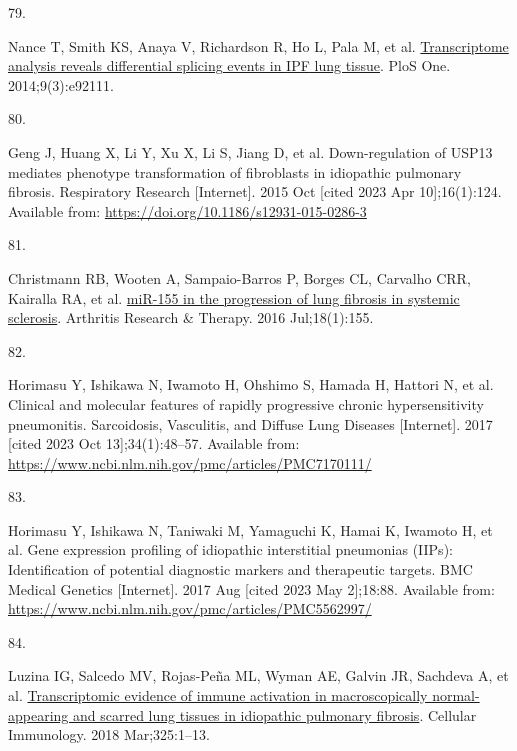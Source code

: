 \documentclass[
]{article}
\newlength{\cslhangindent}
\newlength{\csllabelwidth}
\newenvironment{CSLReferences}[2] %
 {\begin{list}{}{%
  \setlength{\itemindent}{0pt}
  \setlength{\leftmargin}{0pt}
  \setlength{\parsep}{0pt}
  \ifodd #1
   \setlength{\leftmargin}{\cslhangindent}
   \setlength{\itemindent}{-1\cslhangindent}
  \fi
  \setlength{\itemsep}{#2\baselineskip}}}
 {\end{list}}
\newcommand{\CSLLeftMargin}[1]{\parbox[t]{\csllabelwidth}{\strut#1\strut}}
\newcommand{\CSLRightInline}[1]{\parbox[t]{\linewidth - \csllabelwidth}{\strut#1\strut}}
\begin{document}
\begin{CSLReferences}{0}{1}
\CSLLeftMargin{79. }%
\CSLRightInline{Nance T, Smith KS, Anaya V, Richardson R, Ho L, Pala M, et al. \href{https://doi.org/10.1371/journal.pone.0092111}{Transcriptome analysis reveals differential splicing events in {IPF} lung tissue}. PloS One. 2014;9(3):e92111. }

\CSLLeftMargin{80. }%
\CSLRightInline{Geng J, Huang X, Li Y, Xu X, Li S, Jiang D, et al. Down-regulation of {USP13} mediates phenotype transformation of fibroblasts in idiopathic pulmonary fibrosis. Respiratory Research {[}Internet{]}. 2015 Oct {[}cited 2023 Apr 10{]};16(1):124. Available from: \url{https://doi.org/10.1186/s12931-015-0286-3}}

\CSLLeftMargin{81. }%
\CSLRightInline{Christmann RB, Wooten A, Sampaio-Barros P, Borges CL, Carvalho CRR, Kairalla RA, et al. \href{https://doi.org/10.1186/s13075-016-1054-6}{{miR}-155 in the progression of lung fibrosis in systemic sclerosis}. Arthritis Research \& Therapy. 2016 Jul;18(1):155. }

\CSLLeftMargin{82. }%
\CSLRightInline{Horimasu Y, Ishikawa N, Iwamoto H, Ohshimo S, Hamada H, Hattori N, et al. Clinical and molecular features of rapidly progressive chronic hypersensitivity pneumonitis. Sarcoidosis, Vasculitis, and Diffuse Lung Diseases {[}Internet{]}. 2017 {[}cited 2023 Oct 13{]};34(1):48--57. Available from: \url{https://www.ncbi.nlm.nih.gov/pmc/articles/PMC7170111/}}

\CSLLeftMargin{83. }%
\CSLRightInline{Horimasu Y, Ishikawa N, Taniwaki M, Yamaguchi K, Hamai K, Iwamoto H, et al. Gene expression profiling of idiopathic interstitial pneumonias ({IIPs}): Identification of potential diagnostic markers and therapeutic targets. BMC Medical Genetics {[}Internet{]}. 2017 Aug {[}cited 2023 May 2{]};18:88. Available from: \url{https://www.ncbi.nlm.nih.gov/pmc/articles/PMC5562997/}}

\CSLLeftMargin{84. }%
\CSLRightInline{Luzina IG, Salcedo MV, Rojas-Peña ML, Wyman AE, Galvin JR, Sachdeva A, et al. \href{https://doi.org/10.1016/j.cellimm.2018.01.002}{Transcriptomic evidence of immune activation in macroscopically normal-appearing and scarred lung tissues in idiopathic pulmonary fibrosis}. Cellular Immunology. 2018 Mar;325:1--13. }


\end{CSLReferences}
\end{document}
